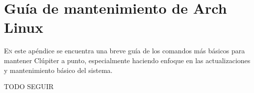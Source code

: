 \chapter{Guía de mantenimiento de Arch Linux}
\label{chap:archlinux_maintenance_guide}

\lettrine{E}{n} este apéndice se encuentra una breve guía de los comandos más básicos para mantener Clúpiter a punto, especialmente haciendo enfoque en las actualizaciones y mantenimiento básico del sistema.

TODO SEGUIR
